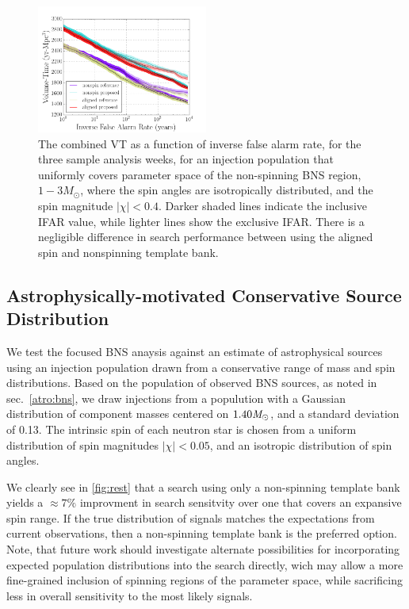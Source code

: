 \begin{figure}
\centering
\includegraphics[width=0.5\textwidth]{papers/bns_o1_dev/figures/prec_combined.png}
\caption{\label{fig:prec} 
The combined VT as a function of inverse false alarm rate, for the
three sample analysis weeks, for an injection population that uniformly covers parameter space of the non-spinning BNS region, $1- 3M_\odot$, where
the spin angles are isotropically distributed, and the spin magnitude $|\chi| < 0.4$. Darker shaded lines indicate the inclusive IFAR value, while lighter lines show the exclusive IFAR. There is a negligible difference in search performance between using the aligned spin and nonspinning template bank.
}
\end{figure}

\subsection{Astrophysically-motivated Conservative Source Distribution}

We test the focused BNS anaysis against an estimate of astrophysical sources using an injection population drawn from a conservative range of mass and spin distributions. Based on the population of observed BNS sources, as noted in sec.~\ref{atro:bns}, we draw injections from a populution with a Gaussian distribution of component masses centered on $1.40 \mathit{M}_\odot$, and a standard deviation of 0.13. The intrinsic spin of each neutron star is chosen from a uniform distribution of spin magnitudes $|\chi| < 0.05$, and an isotropic distribution of spin angles. 

We clearly see in \ref{fig:rest} that a search using only a non-spinning template bank yields a $\approx{7\%}$ improvment in search sensitvity over one that covers an expansive spin range. If the true distribution of signals matches the expectations from current observations, then a non-spinning template bank is the preferred option. Note, that future work should investigate alternate possibilities for incorporating expected population distributions into the search directly, wich may allow a more fine-grained inclusion of spinning regions of the parameter space, while sacrificing less in overall sensitivity to the most likely signals.

